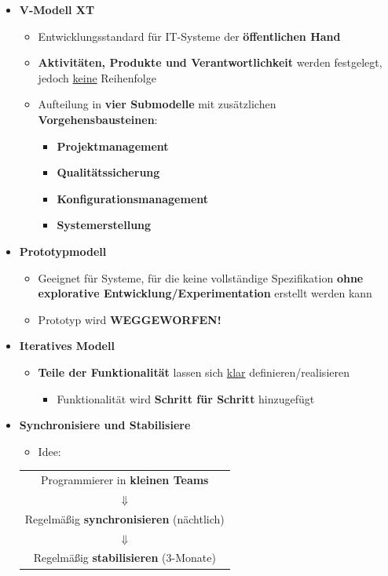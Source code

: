 \documentclass[parskip=full, 12pt]{scrartcl}
\begin{document}
		
		\newpage
		\begin{itemize}
			\item \textbf{V-Modell XT}
			\begin{itemize}
				\item Entwicklungsstandard für IT-Systeme der \textbf{öffentlichen Hand}
				\item \textbf{Aktivitäten, Produkte und Verantwortlichkeit} werden festgelegt, jedoch \underline{keine} Reihenfolge
				\item Aufteilung in \textbf{vier Submodelle} mit zusätzlichen \textbf{Vorgehensbausteinen}:
				\begin{itemize}
					\item \textbf{Projektmanagement}
					\item \textbf{Qualitätssicherung}
					\item \textbf{Konfigurationsmanagement}
					\item \textbf{Systemerstellung}
				\end{itemize}
			\end{itemize}
			\item \textbf{Prototypmodell}
			\begin{itemize}
				\item Geeignet für Systeme, für die keine vollständige Spezifikation \textbf{ohne explorative Entwicklung/Experimentation} erstellt werden kann
				\item Prototyp wird \textbf{WEGGEWORFEN!}
			\end{itemize}
			\item \textbf{Iteratives Modell}
			\begin{itemize}
				\item \textbf{Teile der Funktionalität} lassen sich \underline{klar} definieren/realisieren
				\begin{itemize}
					\item Funktionalität wird \textbf{Schritt für Schritt} hinzugefügt
				\end{itemize}
			\end{itemize}
			\item \textbf{Synchronisiere und Stabilisiere}
			\begin{itemize}
				\item Idee:
			\end{itemize}
			
			\begin{center}
				\begin{tabular}{c}
					Programmierer in \textbf{kleinen Teams} \\
					$\Downarrow$ \\
					Regelmäßig \textbf{synchronisieren} (nächtlich) \\
					$\Downarrow$ \\
					Regelmäßig \textbf{stabilisieren} (3-Monate) \\
				\end{tabular}
			\end{center}
			

\end{itemize}
\end{document}
